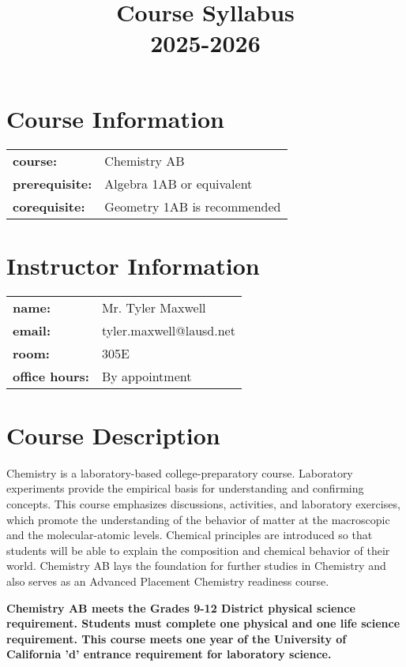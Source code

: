 \documentclass[12pt]{article}
\title{\vspace{-1cm}\textbf{Course Syllabus}\\\large 2025-2026}
\author{}
\date{}
\begin{document}
\maketitle
\vspace{-5em}

\section*{Course Information}
\begin{tabular}{ll}
\textbf{course:} & Chemistry AB \\
\textbf{prerequisite:} & Algebra 1AB or equivalent \\
\textbf{corequisite:} & Geometry 1AB is recommended\\
\end{tabular}


\section*{Instructor Information}
\begin{tabular}{ll}
\textbf{name:} & Mr. Tyler Maxwell \\
\textbf{email:} & tyler.maxwell@lausd.net \\
\textbf{room:} & 305E \\
\textbf{office hours:} & By appointment
\end{tabular}

\section*{Course Description}
Chemistry is a laboratory-based college-preparatory course. Laboratory experiments provide the empirical basis for understanding and confirming concepts. This course emphasizes discussions, activities, and laboratory exercises, which promote the understanding of the behavior of matter at the macroscopic and the molecular-atomic levels. Chemical principles are introduced so that students will be able to explain the composition and chemical behavior of their world. Chemistry AB lays the foundation for further studies in Chemistry and also serves as an Advanced Placement Chemistry readiness course. 

\textbf{Chemistry AB meets the Grades 9-12 District physical science requirement. Students must complete one physical and one life science requirement. This course meets one year of the University of California 'd' entrance requirement for laboratory science.}
\end{document}
